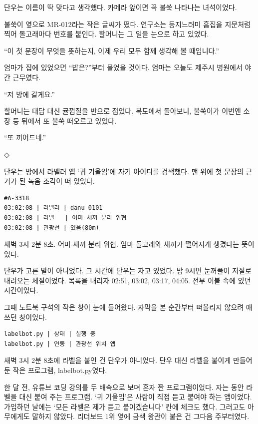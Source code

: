 \documentclass[
  korean,
  letterpaper,
  twoside,
  open=any,
  fontsize=12.5pt,
  headings=small]{scrbook}
\newcommand{\logfont}{\linespread{1}\fontsize{10.8}{15.2}\selectfont}
\begin{document}
단우는 이름이 딱 맞다고
생각했다. 카메라 앞이면 꼭
불쑥 나타나는 녀석이었다.

불쑥이 옆으로 MR-012라는 작은
글씨가 떴다. 연구소는
등지느러미 흠집을 지문처럼
찍어 돌고래마다 번호를 붙인다.
할머니는 그 일을 눈으로 하고
있었다.

``이 첫 문장이 무엇을
뜻하는지, 이제 우리 모두 함께
생각해 볼 때입니다.''

엄마가 집에 있었으면
``밥은?''부터 물었을 것이다.
엄마는 오늘도 제주시 병원에서
야간 근무였다.

``저 방에 갈게요.''

할머니는 대답 대신 귤껍질을
반으로 접었다. 복도에서
돌아보니, 불쑥이가 이번엔 소장
등 뒤에서 또 불쑥 떠오르고
있었다.

``또 끼어드네.''

\begin{center}◇\end{center}\nopagebreak

단우는 방에서 라벨러 앱 `귀
기울임'에 자기 아이디를
검색했다. 맨 위에 첫 문장의
근거가 된 녹음 조각이 떠
있었다.

\begin{Verbatim}[samepage=true,frame=single,framesep=2.5mm,rulecolor=\color{gray},formatcom=\logfont]
#A-3318
03:02:08 | 라벨러 | danu_0101
03:02:08 | 라벨   | 어미-새끼 분리 위협
03:02:08 | 관광선 | 있음(80m)
\end{Verbatim}

새벽 3시 2분 8초. 어미-새끼
분리 위협. 엄마 돌고래와
새끼가 떨어지게 생겼다는
뜻이었다.

단우가 고른 말이 아니었다. 그
시간에 단우는 자고 있었다. 밤
9시면 눈꺼풀이 저절로 내려오는
체질이었다. 목록을 내리자
02:51, 03:02, 03:17, 04:05.
전부 이불 속에 있던
시간이었다.

그때 노트북 구석의 작은 창이
눈에 들어왔다. 자막을 본
순간부터 떠올리지 않으려
애쓰던 창이었다.

\begin{Verbatim}[samepage=true,frame=single,framesep=2.5mm,rulecolor=\color{gray},formatcom=\logfont]
labelbot.py | 상태 | 실행 중
labelbot.py | 연동 | 관광선 위치 앱
\end{Verbatim}

새벽 3시 2분 8초에 라벨을 붙인
건 단우가 아니었다. 단우 대신
라벨을 붙이게 만들어 둔 작은
프로그램, labelbot.py였다.

한 달 전, 유튜브 코딩 강의를
두 배속으로 보며 혼자 짠
프로그램이었다. 자는 동안
라벨을 대신 붙여 주는
프로그램. `귀 기울임'은 사람이
직접 듣고 붙여야 하는
앱이었다. 가입하던 날에는
`모든 라벨은 제가 듣고
붙이겠습니다' 칸에 체크도
했다. 그러고도 아무에게도
말하지 않았다. 리더보드 1위
옆에 금색 왕관이 붙은 건
그다음 주부터였다.
\end{document}
